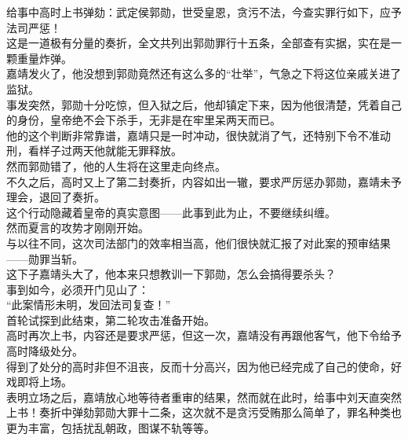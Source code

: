 \begin{multicols}{\theparacolNo}
给事中高时上书弹劾：武定侯郭勋，世受皇恩，贪污不法，今查实罪行如下，应予法司严惩！\\

这是一道极有分量的奏折，全文共列出郭勋罪行十五条，全部查有实据，实在是一颗重量炸弹。\\

嘉靖发火了，他没想到郭勋竟然还有这么多的“壮举”，气急之下将这位亲戚关进了监狱。\\

事发突然，郭勋十分吃惊，但入狱之后，他却镇定下来，因为他很清楚，凭着自己的身份，皇帝绝不会下杀手，无非是在牢里呆两天而已。\\

他的这个判断非常靠谱，嘉靖只是一时冲动，很快就消了气，还特别下令不准动刑，看样子过两天他就能无罪释放。\\

然而郭勋错了，他的人生将在这里走向终点。\\

不久之后，高时又上了第二封奏折，内容如出一辙，要求严厉惩办郭勋，嘉靖未予理会，退回了奏折。\\

这个行动隐藏着皇帝的真实意图——此事到此为止，不要继续纠缠。\\

然而夏言的攻势才刚刚开始。\\

与以往不同，这次司法部门的效率相当高，他们很快就汇报了对此案的预审结果——勋罪当斩。\\

这下子嘉靖头大了，他本来只想教训一下郭勋，怎么会搞得要杀头？\\

事到如今，必须开门见山了：\\

“此案情形未明，发回法司复查！”\\

首轮试探到此结束，第二轮攻击准备开始。\\

高时再次上书，内容还是要求严惩，但这一次，嘉靖没有再跟他客气，他下令给予高时降级处分。\\

得到了处分的高时非但不沮丧，反而十分高兴，因为他已经完成了自己的使命，好戏即将上场。\\

表明立场之后，嘉靖放心地等待者重审的结果，然而就在此时，给事中刘天直突然上书！奏折中弹劾郭勋大罪十二条，这次就不是贪污受贿那么简单了，罪名种类也更为丰富，包括扰乱朝政，图谋不轨等等。\\


\end{multicols}
